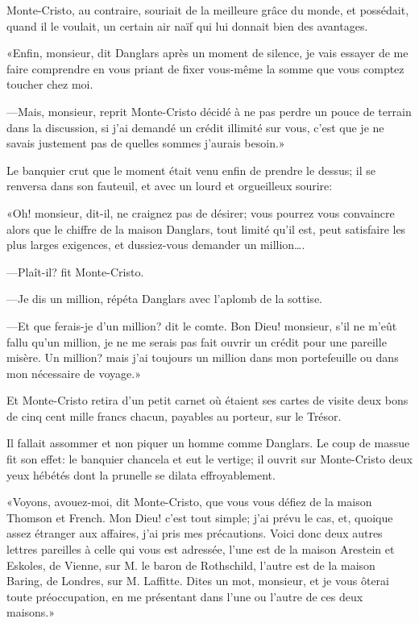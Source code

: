 Monte-Cristo, au contraire, souriait de la meilleure grâce du monde, et possédait, quand il le voulait, un certain air naïf qui lui donnait bien des avantages. 

«Enfin, monsieur, dit Danglars après un moment de silence, je vais essayer de me faire comprendre en vous priant de fixer vous-même la somme que vous comptez toucher chez moi. 

—Mais, monsieur, reprit Monte-Cristo décidé à ne pas perdre un pouce de terrain dans la discussion, si j'ai demandé un crédit illimité sur vous, c'est que je ne savais justement pas de quelles sommes j'aurais besoin.» 

Le banquier crut que le moment était venu enfin de prendre le dessus; il se renversa dans son fauteuil, et avec un lourd et orgueilleux sourire: 

«Oh! monsieur, dit-il, ne craignez pas de désirer; vous pourrez vous convaincre alors que le chiffre de la maison Danglars, tout limité qu'il est, peut satisfaire les plus larges exigences, et dussiez-vous demander un million\dots. 

—Plaît-il? fit Monte-Cristo. 

—Je dis un million, répéta Danglars avec l'aplomb de la sottise. 

—Et que ferais-je d'un million? dit le comte. Bon Dieu! monsieur, s'il ne m'eût fallu qu'un million, je ne me serais pas fait ouvrir un crédit pour une pareille misère. Un million? mais j'ai toujours un million dans mon portefeuille ou dans mon nécessaire de voyage.» 

Et Monte-Cristo retira d'un petit carnet où étaient ses cartes de visite deux bons de cinq cent mille francs chacun, payables au porteur, sur le Trésor. 

Il fallait assommer et non piquer un homme comme Danglars. Le coup de massue fit son effet: le banquier chancela et eut le vertige; il ouvrit sur Monte-Cristo deux yeux hébétés dont la prunelle se dilata effroyablement. 

«Voyons, avouez-moi, dit Monte-Cristo, que vous vous défiez de la maison Thomson et French. Mon Dieu! c'est tout simple; j'ai prévu le cas, et, quoique assez étranger aux affaires, j'ai pris mes précautions. Voici donc deux autres lettres pareilles à celle qui vous est adressée, l'une est de la maison Arestein et Eskoles, de Vienne, sur M. le baron de Rothschild, l'autre est de la maison Baring, de Londres, sur M. Laffitte. Dites un mot, monsieur, et je vous ôterai toute préoccupation, en me présentant dans l'une ou l'autre de ces deux maisons.» 

